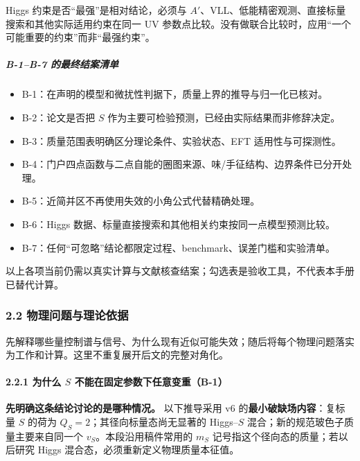 \documentclass[
  chinese,
  UTF8]{ctexart}
\providecommand{\tightlist}{%
  \setlength{\itemsep}{0pt}\setlength{\parskip}{0pt}}
\begin{document}
Higgs 约束是否``最强''是相对结论，必须与
\(A'\)、VLL、低能精密观测、直接标量搜索和其他实际适用约束在同一 UV
参数点比较。没有做联合比较时，应用``一个可能重要的约束''而非``最强约束''。

\subparagraph{B-1--B-7
的最终结案清单}\label{b-1b-7-ux7684ux6700ux7ec8ux7ed3ux6848ux6e05ux5355}

\begin{itemize}
\tightlist
\item[$\square$]
  B-1：在声明的模型和微扰性判据下，质量上界的推导与归一化已核对。
\item[$\square$]
  B-2：论文是否把 \(S\) 作为主要可检验预测，已经由实际结果而非修辞决定。
\item[$\square$]
  B-3：质量范围表明确区分理论条件、实验状态、EFT 适用性与可探测性。
\item[$\square$]
  B-4：门户四点函数与二点自能的圈图来源、味/手征结构、边界条件已分开处理。
\item[$\square$]
  B-5：近简并区不再使用失效的小角公式代替精确处理。
\item[$\square$]
  B-6：Higgs 数据、标量直接搜索和其他相关约束按同一点模型预测比较。
\item[$\square$]
  B-7：任何``可忽略''结论都限定过程、benchmark、误差门槛和实验清单。
\end{itemize}

以上各项当前仍需以真实计算与文献核查结案；勾选表是验收工具，不代表本手册已替代计算。

\subsubsection{2.2 物理问题与理论依据}\label{major-1-step-2}

先解释哪些量控制谱与信号、为什么现有近似可能失效；随后将每个物理问题落实为工作和计算。这里不重复展开后文的完整对角化。

\paragraph{\texorpdfstring{2.2.1 为什么 \(S\)
不能在固定参数下任意变重（B-1）}{2.2.1 为什么 S 不能在固定参数下任意变重（B-1）}}\label{ux4e3aux4ec0ux4e48-s-ux4e0dux80fdux5728ux56faux5b9aux53c2ux6570ux4e0bux4efbux610fux53d8ux91cdb-1}

\textbf{先明确这条结论讨论的是哪种情况。} 以下推导采用 v6
的\textbf{最小破缺场内容}：复标量 \(S\) 的荷为
\(Q_S=2\)；其径向标量态尚无显著的 Higgs--\(S\)
混合；新的规范玻色子质量主要来自同一个 \(v_S\)。本段沿用稿件常用的
\(m_S\) 记号指这个径向态的质量；若以后研究 Higgs
混合态，必须重新定义物理质量本征值。
\end{document}
